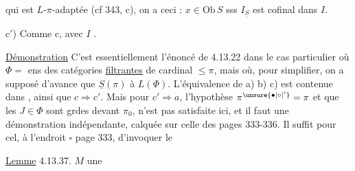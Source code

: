qui est $L$-$\pi$-adaptée (cf  343, c), on a ceci : $x\in\mathrm{Ob}\,S$ sss $I_{\underline S}$ est cofinal dans $I$.

c$'$) Comme c, avec $I$ .


\uline{Démonstration} C'est essentiellement l'énoncé de 4.13.22 dans le cas particulier où $\Phi={}$ ens des catégories \uline{filtrantes} de cardinal $\leq\pi$, mais où, pour simplifier, on a supposé d'avance que $\underline S(\pi)$  à $L(\Phi)$. L'équivalence de a) b) c) est contenue dans , ainsi que $c\Longrightarrow c'$. Mais  pour $c'\Longrightarrow a$,  l'hypothèse  $\pi^{\unsure{\bullet|\circ|'}}=\pi$ et  que les $J\in\Phi$ sont grdes devant $\pi_0$, n'est pas satisfaite ici, et il faut une démonstration indépendante, calquée sur celle des  pages 333-336.  Il suffit pour cel, à l'endroit $\square$ page 333, d'invoquer le

\uline{Lemme} 4.13.37.  $M$ une 

